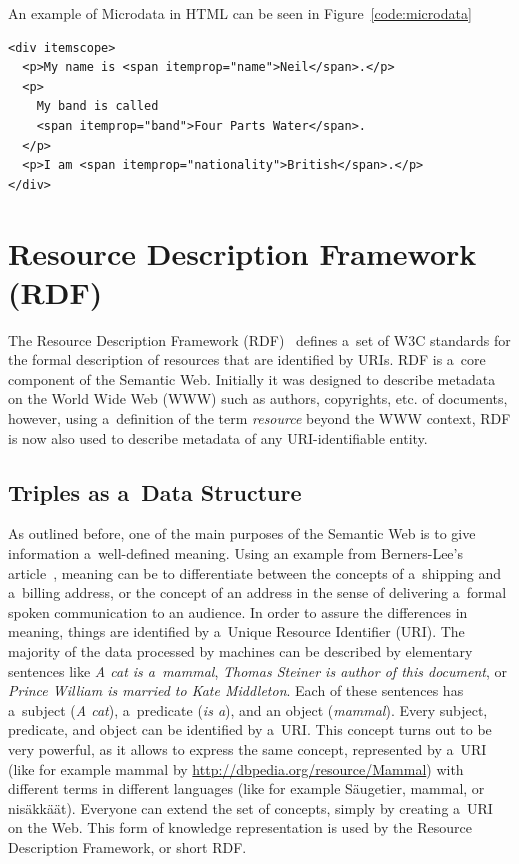 An example of Microdata in HTML can be seen in Figure~\ref{code:microdata}

\begin{lstlisting}[caption={[Sample code snippet with Microdata mark-up.]{Sample code snippet with Microdata mark-up. Source: \url{http://www.w3.org/TR/microdata/}}},label={code:microdata}]
<div itemscope>
  <p>My name is <span itemprop="name">Neil</span>.</p>
  <p>
    My band is called
    <span itemprop="band">Four Parts Water</span>.
  </p>
  <p>I am <span itemprop="nationality">British</span>.</p>
</div>
\end{lstlisting}

\section{Resource Description Framework (RDF)} \label{sec:rdf}
The Resource Description Framework (RDF)~\cite{Klyne2004} defines
a~set of W3C standards for the formal description of resources that are identified by URIs.
RDF is a~core component of the Semantic Web.
Initially it was designed to describe metadata on the World Wide Web (WWW) such as authors,
copyrights, etc. of documents, however, using a~definition of the term \emph{resource}
beyond the WWW context, RDF is now also used to describe metadata of any URI-identifiable entity.

\subsection{Triples as a~Data Structure}
As outlined before, one of the main purposes of the Semantic Web is to give information
a~well-defined meaning.
Using an example from Berners-Lee’s article~\cite{BernersLee2001},
meaning can be to differentiate between the concepts of a~shipping and a~billing address,
or the concept of an address in the sense of delivering a~formal spoken communication to an audience.
In order to assure the differences in meaning,
things are identified by a~Unique Resource Identifier (URI).
The majority of the data processed by machines can be described by elementary sentences like
\emph{A cat is a~mammal}, \emph{Thomas Steiner is author of this document}, or
\emph{Prince William is married to Kate Middleton}.
Each of these sentences has a~subject (\emph{A cat}), a~predicate (\emph{is a}),
and an object (\emph{mammal}).
Every subject, predicate, and object can be identified by a~URI.
This concept turns out to be very powerful, as it allows to express the same concept,
represented by a~URI (like for example mammal by \url{http://dbpedia.org/resource/Mammal})
with different terms in different languages (like for example Säugetier, mammal, or nisäkkäät). 
Everyone can extend the set of concepts, simply by creating a~URI on the Web.
This form of knowledge representation is used by the Resource Description Framework, or short RDF.

